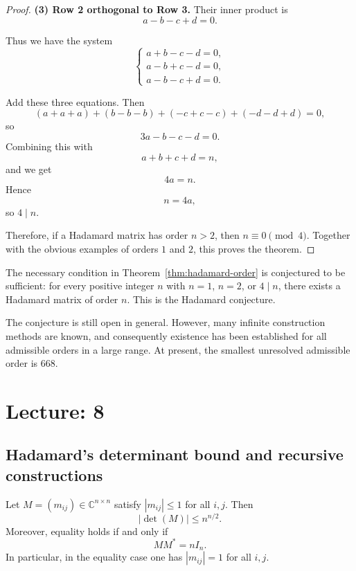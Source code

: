 \documentclass[11pt, a4paper]{ctexrep}
\begin{document}
\begin{proof}
    \noindent
    \textbf{(3) Row 2 orthogonal to Row 3.}
    Their inner product is
    \[
        a-b-c+d=0.
    \]

    Thus we have the system
    \[
        \begin{cases}
            a+b-c-d=0, \\
            a-b+c-d=0, \\
            a-b-c+d=0.
        \end{cases}
    \]

    Add these three equations. Then
    \[
        (a+a+a)+(b-b-b)+(-c+c-c)+(-d-d+d)=0,
    \]
    so
    \[
        3a-b-c-d=0.
    \]
    Combining this with
    \[
        a+b+c+d=n,
    \]
    and we get
    \[
        4a=n.
    \]
    Hence
    \[
        n=4a,
    \]
    so $4\mid n$.

    Therefore, if a Hadamard matrix has order $n>2$, then $n\equiv 0\pmod{4}$.
    Together with the obvious examples of orders $1$ and $2$, this proves the theorem.
\end{proof}

\begin{remark}
    The necessary condition in Theorem~\ref{thm:hadamard-order} is conjectured to be sufficient:
    for every positive integer $n$ with $n=1$, $n=2$, or $4\mid n$, there exists a Hadamard matrix of order $n$.
    This is the Hadamard conjecture.

    The conjecture is still open in general. However, many infinite construction methods are known,
    and consequently existence has been established for all admissible orders in a large range.
    At present, the smallest unresolved admissible order is $668$.
\end{remark}

\chapter{Lecture: 8}

\section{Hadamard's determinant bound and recursive constructions}

\begin{theorem}[Hadamard, 1893]\label{thm:hadamard-determinant}
    Let $M=(m_{ij})\in \mathbb{C}^{n\times n}$ satisfy $|m_{ij}|\leqslant 1$ for all $i,j$.
    Then
    \[
        |\det(M)|\leqslant n^{n/2}.
    \]
    Moreover, equality holds if and only if
    \[
        MM^{*}=nI_n.
    \]
    In particular, in the equality case one has $|m_{ij}|=1$ for all $i,j$.
\end{theorem}
\end{document}
